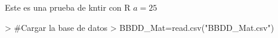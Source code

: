 \documentclass{article}
\begin{document}

Este es una prueba de kntir con R $a=25$
\begin{Schunk}
\begin{Sinput}
> #Cargar la base de datos
> BBDD_Mat=read.csv("BBDD_Mat.csv")
\end{Sinput}
\end{Schunk}
\end{document}
